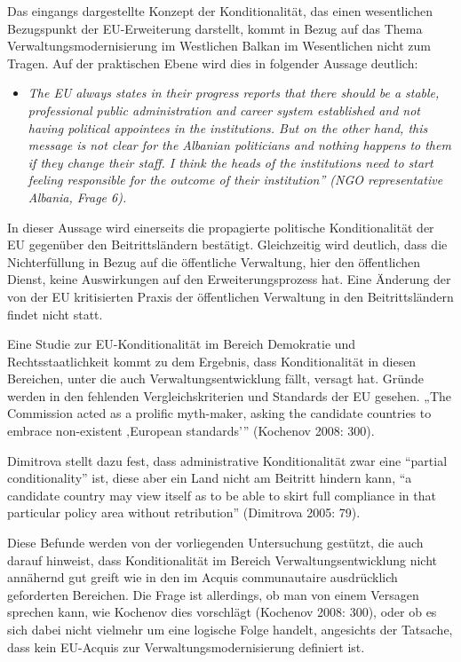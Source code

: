 Das eingangs dargestellte Konzept der Konditionalität, das einen wesentlichen Bezugspunkt der EU-Erweiterung darstellt, kommt in Bezug auf das Thema Verwaltungsmodernisierung im Westlichen Balkan im Wesentlichen nicht zum Tragen. Auf der praktischen Ebene wird dies in folgender Aussage deutlich:
\begin{itemize}[label={}]
\item \textit{The EU always states in their progress reports that there should be a stable, professional public administration and career system established and not having political appointees in the institutions. But on the other hand, this message is not clear for the Albanian politicians and nothing happens to them if they change their staff. I think the heads of the institutions need to start feeling responsible for the outcome of their institution” (NGO representative Albania, Frage 6).}
\end{itemize}
In dieser Aussage wird einerseits die propagierte politische Konditionalität der EU gegenüber den Beitrittsländern bestätigt. Gleichzeitig wird deutlich, dass die Nichterfüllung in Bezug auf die öffentliche Verwaltung, hier den öffentlichen Dienst, keine Auswirkungen auf den Erweiterungsprozess hat. Eine Änderung der von der EU kritisierten Praxis der öffentlichen Verwaltung in den Beitrittsländern findet nicht statt.\par
Eine Studie zur EU-Konditionalität im Bereich Demokratie und Rechtsstaatlichkeit kommt zu dem Ergebnis, dass Konditionalität in diesen Bereichen, unter die auch Verwaltungsentwicklung fällt, versagt hat. Gründe werden in den fehlenden Vergleichskriterien und Standards der EU gesehen. „The Commission acted as a prolific myth-maker, asking the candidate countries to embrace non-existent ‚European standards’” (Kochenov 2008: 300).\par
Dimitrova stellt dazu fest, dass administrative Konditionalität zwar eine “partial conditionality” ist, diese aber ein Land nicht am Beitritt hindern kann, “a candidate country may view itself as to be able to skirt full compliance in that particular policy area without retribution” (Dimitrova 2005: 79). \par
Diese Befunde werden von der vorliegenden Untersuchung gestützt, die auch darauf hinweist, dass Konditionalität im Bereich Verwaltungsentwicklung nicht annähernd gut greift wie in den im Acquis communautaire ausdrücklich geforderten Bereichen. Die Frage ist allerdings, ob man von einem Versagen sprechen kann, wie Kochenov dies vorschlägt (Kochenov 2008: 300), oder ob es sich dabei nicht vielmehr um eine logische Folge handelt, angesichts der Tatsache, dass kein EU-Acquis zur Verwaltungsmodernisierung definiert ist.\par
